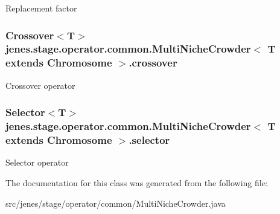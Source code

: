Replacement factor \hypertarget{classjenes_1_1stage_1_1operator_1_1common_1_1_multi_niche_crowder_3_01_t_01extends_01_chromosome_01_4_d584be099b23576ec3379a6867d31ef4}{
\subsubsection[crossover]{\setlength{\rightskip}{0pt plus 5cm}Crossover$<$T$>$ jenes.stage.operator.common.MultiNicheCrowder$<$ T extends Chromosome $>$.{\bf crossover}}}
\label{classjenes_1_1stage_1_1operator_1_1common_1_1_multi_niche_crowder_3_01_t_01extends_01_chromosome_01_4_d584be099b23576ec3379a6867d31ef4}


Crossover operator \hypertarget{classjenes_1_1stage_1_1operator_1_1common_1_1_multi_niche_crowder_3_01_t_01extends_01_chromosome_01_4_ec9f82fc79b7a63f5e664dfbcc7e9563}{
\subsubsection[selector]{\setlength{\rightskip}{0pt plus 5cm}Selector$<$T$>$ jenes.stage.operator.common.MultiNicheCrowder$<$ T extends Chromosome $>$.{\bf selector}}}
\label{classjenes_1_1stage_1_1operator_1_1common_1_1_multi_niche_crowder_3_01_t_01extends_01_chromosome_01_4_ec9f82fc79b7a63f5e664dfbcc7e9563}


Selector operator 

The documentation for this class was generated from the following file:\begin{CompactItemize}
\item 
src/jenes/stage/operator/common/MultiNicheCrowder.java\end{CompactItemize}
